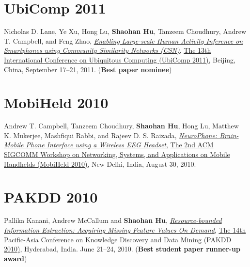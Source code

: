 \section{\sc UbiComp 2011}\hypertarget{lane2011ubicomp}{}
Nicholas D. Lane, Ye Xu, Hong Lu, \textbf{Shaohan Hu}, Tanzeem Choudhury, Andrew T. Campbell, and Feng Zhao,
\href{http://portal.acm.org/citation.cfm?id=2030160}{\emph{Enabling Large-scale Human Activity Inference on Smartphones using Community Similarity Networks (CSN)}},
\href{http://www.ubicomp.org/ubicomp2011/}{\textsf{The 13th International Conference on Ubiquitous Computing (UbiComp 2011)}},
Beijing, China, September 17--21, 2011. (\textbf{Best paper nominee})

\section{\sc MobiHeld 2010}\hypertarget{campbell2010mobiheld}{}
Andrew T. Campbell, Tanzeem Choudhury, \textbf{Shaohan Hu}, Hong Lu, Matthew K. Mukerjee, Mashfiqui Rabbi, and Rajeev D. S. Raizada,
\href{http://portal.acm.org/citation.cfm?id=1851326}{\emph{NeuroPhone: Brain-Mobile Phone Interface using a Wireless EEG Headset}},
\href{http://conferences.sigcomm.org/sigcomm/2010/mhcfp.php}{\textsf{The 2nd ACM SIGCOMM Workshop on Networking, Systems, and Applications on Mobile Handhelds (MobiHeld 2010)}},
New Delhi, India, August 30, 2010.

\section{\sc PAKDD 2010}\hypertarget{kanani2010pakdd}{}
Pallika Kanani, Andrew McCallum and \textbf{Shaohan Hu},
\href{http://www.springerlink.com/content/j41w758434321108}{\emph{Resource-bounded Information Extraction: Acquiring Missing Feature Values On Demand}},
\href{http://www.iiit.ac.in/conferences/pakdd2010}{\textsf{The 14th Pacific-Asia Conference on Knowledge Discovery and Data Mining (PAKDD 2010)}},
Hyderabad, India. June 21--24, 2010. (\textbf{Best student paper runner-up award})

